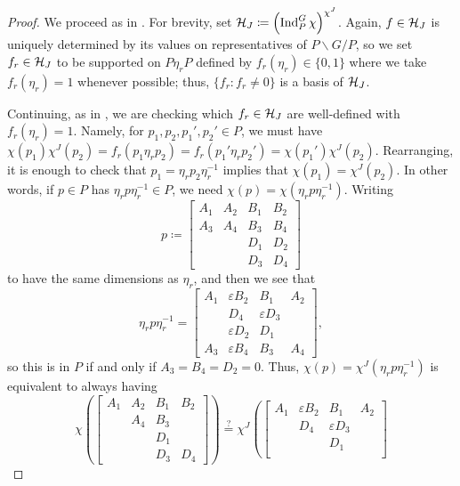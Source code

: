 \begin{proof}
	We proceed as in . For brevity, set $\mathcal{H}_J\coloneqq\left(\operatorname{Ind}_P^G\chi\right)^{\chi^J}$. Again, $f\in\mathcal{H}_J$ is uniquely determined by its values on representatives of $P\backslash G/P$, so we set $f_r\in\mathcal{H}_J$ to be supported on $P\eta_rP$ defined by $f_r(\eta_r)\in\{0,1\}$ where we take $f_r(\eta_r)=1$ whenever possible; thus, $\{f_r:f_r\ne0\}$ is a basis of $\mathcal{H}_J$.

	Continuing, as in , we are checking which $f_r\in\mathcal{H}_J$ are well-defined with $f_r(\eta_r)=1$. Namely, for $p_1,p_2,p_1',p_2'\in P$, we must have $\chi(p_1)\chi^J(p_2)=f_r(p_1\eta_rp_2)=f_r(p_1'\eta_rp_2')=\chi(p_1')\chi^J(p_2)$. Rearranging, it is enough to check that $p_1=\eta_rp_2\eta_r^{-1}$ implies that $\chi(p_1)=\chi^J(p_2)$. In other words, if $p\in P$ has $\eta_rp\eta_r^{-1}\in P$, we need $\chi(p)=\chi\left(\eta_rp\eta_r^{-1}\right)$. Writing
	\[p\coloneqq\begin{bmatrix}
        A_1 & A_2 & B_1 & B_2 \\
        A_3 & A_4 & B_3 & B_4 \\
            &     & D_1 & D_2 \\
            &     & D_3 & D_4
    \end{bmatrix}\]
    to have the same dimensions as $\eta_r$, and then we see that
    \[\eta_rp\eta_r^{-1} = \begin{bmatrix}
		A_1 & \varepsilon B_2 &  B_1 & A_2 \\
			&  D_4 & \varepsilon D_3 \\
			& \varepsilon D_2 &  D_1 \\
		A_3 & \varepsilon B_4 &  B_3 & A_4
	\end{bmatrix},\]
	so this is in $P$ if and only if $A_3=B_4=D_2=0$. Thus, $\chi(p)=\chi^J\left(\eta_rp\eta_r^{-1}\right)$ is equivalent to always having
	\[\chi\left(\begin{bmatrix}
        A_1 & A_2 & B_1 & B_2 \\
            & A_4 & B_3 &     \\
            &     & D_1 &     \\
            &     & D_3 & D_4
    \end{bmatrix}\right)\stackrel?=\chi^J\left(\begin{bmatrix}
        A_1 & \varepsilon B_2 &  B_1 & A_2 \\
            &  D_4 & \varepsilon D_3 \\
            &      &  D_1 \\

\end{bmatrix}\]
\end{proof}
